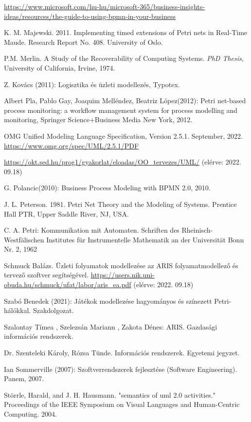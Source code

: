\documentclass[12pt]{article}
\begin{document}
\begin{thebibliography}{99}
\url{https://www.microsoft.com/hu-hu/microsoft-365/business-insights-ideas/resources/the-guide-to-using-bpmn-in-your-business}

K. M. Majewski. 2011. Implementing timed extensions of Petri nets in Real-Time Maude. Research Report No. 408. University of Oslo.

P.M. Merlin. A Study of the Recoverability of Computing Systems.
{\it PhD Thesis}, University of California, Irvine, 1974.

Z. Kovács (2011):  Logisztika és üzleti modellezés, Typotex.

 Albert Pla, Pablo Gay, Joaquim Melléndez, Beatriz López(2012): Petri net-based process monitoring: a 
workflow management system for process modelling and monitoring, Springer 
Science+Business Media New York, 2012. 

OMG Unified Modeling Language Specification, Version 2.5.1. September, 2022.
\url{https://www.omg.org/spec/UML/2.5.1/PDF}

\url{https://okt.sed.hu/prog1/gyakorlat/eloadas/OO_tervezes/UML/} (elérve: 2022. 09.18)

G. Polancic(2010): Business Process Modeling with BPMN 2.0, 2010. 

 J. L. Peterson. 1981. Petri Net Theory and the Modeling of Systems. Prentice Hall PTR, Upper 
Saddle River, NJ, USA.

 C. A. Petri: Kommunikation mit Automaten. Schriften des 
Rheinisch-Westfälischen Institutes für Instrumentelle
Mathematik an der Universität Bonn Nr. 2, 1962

Schmuck Balázs. Üzleti folyamatok modellezése az ARIS folyamatmodellező és tervező szoftver segítségével.
\url{https://users.nik.uni-obuda.hu/schmuck/ufat/labor/aris_ea.pdf} (elérve: 2022. 09.18)

Szabó Benedek (2021): Játékok modellezése hagyományos és színezett Petri-hálókkal. Szakdolgozat.

Szalontay Tímea , Szelezsán Mariann , Zakota Dénes: ARIS. Gazdasági információs rendszerek.

Dr. Szenteleki Károly, Rózsa Tünde. Információs rendszerek. Egyetemi jegyzet.

Ian Sommerville (2007): Szoftverrendszerek fejlesztése (Software Engineering). Panem, 2007.

Störrle, Harald, and J. H. Hausmann. "semantics of uml 2.0 activities." Proceedings of the IEEE Symposium on Visual Languages and Human-Centric Computing. 2004.


\end{thebibliography}
\end{document}
